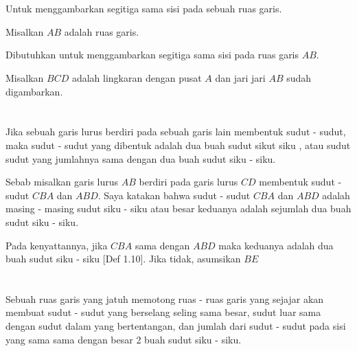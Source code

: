 \documentclass[a4paper, 12pt]{book}
\begin{document}
\section*{\centering \thesection} 
Untuk menggambarkan segitiga sama sisi pada sebuah ruas garis.  


Misalkan $AB$ adalah ruas garis.

Dibutuhkan untuk menggambarkan segitiga sama sisi pada ruas garis $AB$.

Misalkan $BCD$ adalah lingkaran dengan pusat $A$ dan jari jari $AB$ sudah digambarkan.

\setcounter{section}{13}
\section*{\centering \thesection} 
Jika sebuah garis lurus berdiri pada sebuah garis lain membentuk sudut - sudut, maka
sudut - sudut yang dibentuk adalah dua buah sudut sikut siku , atau sudut sudut yang
jumlahnya sama dengan dua buah sudut siku - siku.

Sebab misalkan garis lurus $AB$ berdiri pada garis lurus $CD$ membentuk 
sudut - sudut $CBA$ dan $ABD$. Saya katakan bahwa sudut - sudut $CBA$ dan
$ABD$ adalah masing - masing sudut siku - siku atau besar keduanya adalah 
sejumlah dua buah sudut siku - siku.

Pada kenyattannya, jika $CBA$ sama dengan $ABD$ maka keduanya adalah dua buah 
sudut siku - siku [Def 1.10]. Jika tidak, asumsikan $BE$
\setcounter{section}{29}
\section*{\centering \thesection} 
Sebuah ruas garis yang jatuh memotong ruas - ruas garis yang sejajar akan membuat
sudut - sudut yang berselang seling sama besar, sudut luar sama dengan sudut dalam
yang bertentangan, dan jumlah dari sudut - sudut pada sisi yang sama sama dengan
besar 2 buah sudut siku - siku.  
\end{document}
